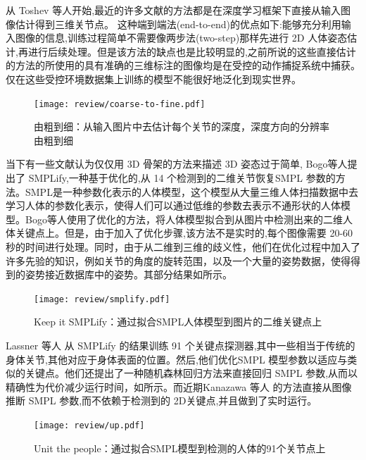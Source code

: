 从 Toshev \autocite{toshev2014deep}等人开始,最近的许多文献的方法都是在深度学习框架下直接从输入图像估计得到三维关节点\autocite{pavlakos2017coarse,zhou2017weaklysupervised}。%
这种端到端法(end-to-end)的优点如下:能够充分利用输入图像的信息,训练过程简单不需要像两步法(two-step)那样先进行 2D 人体姿态估计,再进行后续处理。但是该方法的缺点也是比较明显的,之前所说的这些直接估计的方法的所使用的具有准确的三维标注的图像均是在受控的动作捕捉系统中捕获。仅在这些受控环境数据集上训练的模型不能很好地泛化到现实世界。

\begin{figure}[ht]
    \centering
    \texttt{[image: review/coarse-to-fine.pdf]}
    \caption{由粗到细\autocite{pavlakos2017coarse}：从输入图片中去估计每个关节的深度，深度方向的分辨率由粗到细}\label{fig:c2f}
\end{figure}

当下有一些文献认为仅仅用 3D 骨架的方法来描述 3D 姿态过于简单, Bogo等人\autocite{bogo2016keep}提出了 SMPLify,一种基于优化的,从 14 个检测到的二维关节恢复SMPL 参数的方法。SMPL\autocite{loper2015smpl}是一种参数化表示的人体模型，这个模型从大量三维人体扫描数据中去学习人体的参数化表示，使得人们可以通过低维的参数去表示不通形状的人体模型。Bogo等人\autocite{bogo2016keep}使用了优化的方法，将人体模型拟合到从图片中检测出来的二维人体关键点上。但是，由于加入了优化步骤,该方法不是实时的,每个图像需要 20-60 秒的时间进行处理。同时，由于从二维到三维的歧义性，他们在优化过程中加入了许多先验的知识，例如关节的角度的旋转范围，以及一个大量的姿势数据，使得得到的姿势接近数据库中的姿势。其部分结果如所示。 

\begin{figure}[ht]
    \centering
    \texttt{[image: review/smplify.pdf]}
    \caption{Keep it SMPLify\autocite{bogo2016keep}：通过拟合SMPL人体模型到图片的二维关键点上}\label{fig:smpl1}
\end{figure}

Lassner \autocite{lassner2017unite} 等人 从 SMPLify 的结果训练 91 个关键点探测器,其中一些相当于传统的身体关节,其他对应于身体表面的位置。然后,他们优化SMPL 模型参数以适应与\autocite{bogo2016keep}类似的关键点。他们还提出了一种随机森林回归方法来直接回归 SMPL 参数,从而以精确性为代价减少运行时间，如所示。而近期Kanazawa 等人\autocite{kanazawa2018end} 的方法直接从图像推断 SMPL 参数,而不依赖于检测到的 2D关键点,并且做到了实时运行。

\begin{figure}[ht]
    \centering
    \texttt{[image: review/up.pdf]}
    \caption{Unit the people\autocite{lassner2017unite}：通过拟合SMPL模型到检测的人体的91个关节点上}\label{fig:up}
\end{figure}

